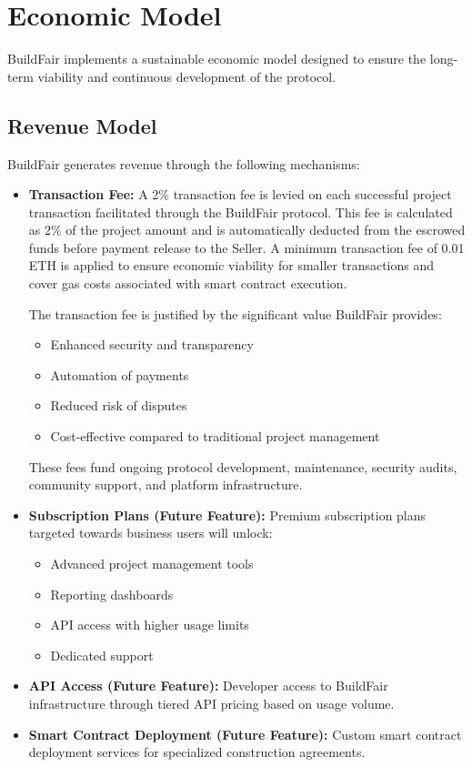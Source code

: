 \documentclass[12pt]{article}
\begin{document}
\section{Economic Model}
BuildFair implements a sustainable economic model designed to ensure the long-term viability and continuous development of the protocol.

\subsection{Revenue Model}
BuildFair generates revenue through the following mechanisms:

\begin{itemize}
    \item \textbf{Transaction Fee:} A 2\% transaction fee is levied on each successful project transaction facilitated through the BuildFair protocol. This fee is calculated as 2\% of the project amount and is automatically deducted from the escrowed funds before payment release to the Seller. A minimum transaction fee of 0.01 ETH is applied to ensure economic viability for smaller transactions and cover gas costs associated with smart contract execution.
    
    The transaction fee is justified by the significant value BuildFair provides:
    \begin{itemize}
        \item Enhanced security and transparency
        \item Automation of payments
        \item Reduced risk of disputes
        \item Cost-effective compared to traditional project management
    \end{itemize}
    
    These fees fund ongoing protocol development, maintenance, security audits, community support, and platform infrastructure.
    
    \item \textbf{Subscription Plans (Future Feature):} Premium subscription plans targeted towards business users will unlock:
    \begin{itemize}
        \item Advanced project management tools
        \item Reporting dashboards
        \item API access with higher usage limits
        \item Dedicated support
    \end{itemize}
    
    \item \textbf{API Access (Future Feature):} Developer access to BuildFair infrastructure through tiered API pricing based on usage volume.
    
    \item \textbf{Smart Contract Deployment (Future Feature):} Custom smart contract deployment services for specialized construction agreements.
\end{itemize}
\end{document}
